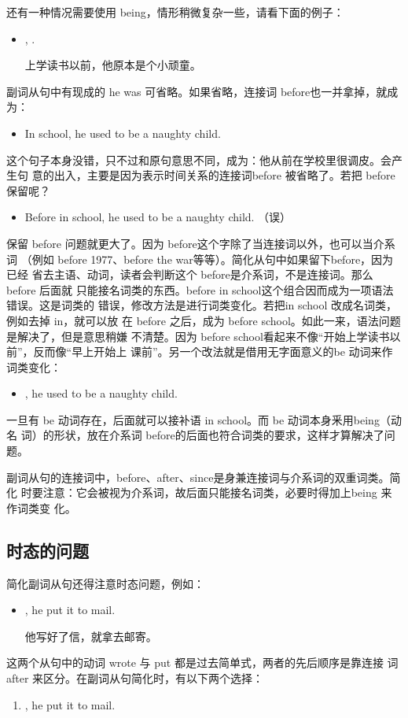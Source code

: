 还有一种情况需要使用 being，情形稍微复杂一些，请看下面的例子：
\begin{itemize}
\item {},   .

  上学读书以前，他原本是个小顽童。
\end{itemize}
副词从句中有现成的 he was 可省略。如果省略，连接词 before也一并拿掉，就成为：
\begin{itemize}
\item In school, he used to be a naughty child.
\end{itemize}
这个句子本身没错，只不过和原句意思不同，成为：他从前在学校里很调皮。会产生句
意的出入，主要是因为表示时间关系的连接词before 被省略了。若把 before 保留呢？
\begin{itemize}
\item Before in school, he used to be a naughty child. （误）
\end{itemize}
保留 before 问题就更大了。因为 before这个字除了当连接词以外，也可以当介系词
（例如 before 1977、before the war等等）。简化从句中如果留下before，因为已经
省去主语、动词，读者会判断这个 before是介系词，不是连接词。那么 before 后面就
只能接名词类的东西。before in school这个组合因而成为一项语法错误。这是词类的
错误，修改方法是进行词类变化。若把in school 改成名词类，例如去掉 in，就可以放
在 before 之后，成为 before school。如此一来，语法问题是解决了，但是意思稍嫌
不清楚。因为 before school看起来不像“开始上学读书以前”，反而像“早上开始上
课前”。另一个改法就是借用无字面意义的be 动词来作词类变化：
\begin{itemize}
\item {}, he used to be a naughty child.
\end{itemize}
一旦有 be 动词存在，后面就可以接补语 in school。而 be 动词本身釆用being（动名
词）的形状，放在介系词 before的后面也符合词类的要求，这样才算解决了问题。

副词从句的连接词中，before、after、since是身兼连接词与介系词的双重词类。简化
时要注意：它会被视为介系词，故后面只能接名词类，必要时得加上being 来作词类变
化。

\subsection{时态的问题}

简化副词从句还得注意时态问题，例如：
\begin{itemize}
\item {}, he put it to mail.

  他写好了信，就拿去邮寄。
\end{itemize}
这两个从句中的动词 wrote 与 put 都是过去简单式，两者的先后顺序是靠连接
词after 来区分。在副词从句简化时，有以下两个选择：
\begin{enumerate}
\item {}, he put it to mail.
\end{enumerate}

